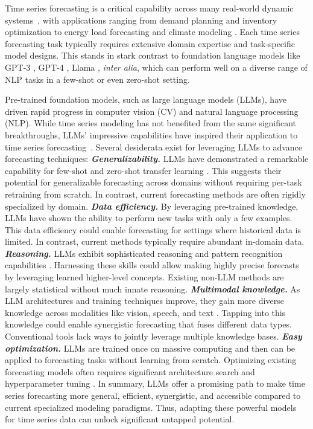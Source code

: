 Time series forecasting is a critical capability across many real-world dynamic systems~\citep{jin2023survey}, with applications ranging from demand planning \citep{leonard2001promotional} and inventory optimization \citep{li2022demand} to energy load forecasting \citep{liu2023sadi} and climate modeling \citep{schneider1974climate}. Each time series forecasting task typically requires extensive domain expertise and task-specific model designs. This stands in stark contrast to foundation language models like GPT-3 \citep{brown2020language}, GPT-4 \citep{openai2023gpt4}, Llama \citep{touvron2023llama}, \emph{inter alia}, which can perform well on a diverse range of NLP tasks in a few-shot or even zero-shot setting.

Pre-trained foundation models, such as large language models (LLMs), have driven rapid progress in computer vision (CV) and natural language processing (NLP). While time series modeling has not benefited from the same significant breakthroughs, LLMs' impressive capabilities have inspired their application to time series forecasting~\citep{jin2023large}. Several desiderata exist for leveraging LLMs to advance forecasting techniques: \textbf{\textit{Generalizability.}} LLMs have demonstrated a remarkable capability for few-shot and zero-shot transfer learning \citep{brown2020language}. This suggests their potential for generalizable forecasting across domains without requiring per-task retraining from scratch. In contrast, current forecasting methods are often rigidly specialized by domain. \textbf{\textit{Data efficiency.}} By leveraging pre-trained knowledge, LLMs have shown the ability to perform new tasks with only a few examples. This data efficiency could enable forecasting for settings where historical data is limited. In contrast, current methods typically require abundant in-domain data. \textbf{\textit{Reasoning.}} LLMs exhibit sophisticated reasoning and pattern recognition capabilities \citep{mirchandani2023large,wang2023enhancing,chu2023leveraging}. Harnessing these skills could allow making highly precise forecasts by leveraging learned higher-level concepts.
Existing non-LLM methods are largely statistical without much innate reasoning. \textbf{\textit{Multimodal knowledge.}} As LLM architectures and training techniques improve, they gain more diverse knowledge across modalities like vision, speech, and text \citep{ma2023leveraging}. Tapping into this knowledge could enable synergistic forecasting that fuses different data types. Conventional tools lack ways to jointly leverage multiple knowledge bases. \textbf{\textit{Easy optimization.}} LLMs are trained once on massive computing and then can be applied to forecasting tasks without learning from scratch. Optimizing existing forecasting models often requires significant architecture search and hyperparameter tuning \citep{zhou2023ptse}. In summary, LLMs offer a promising path to make time series forecasting more general, efficient, synergistic, and accessible compared to current specialized modeling paradigms. Thus, adapting these powerful models for time series data can unlock significant untapped potential.

